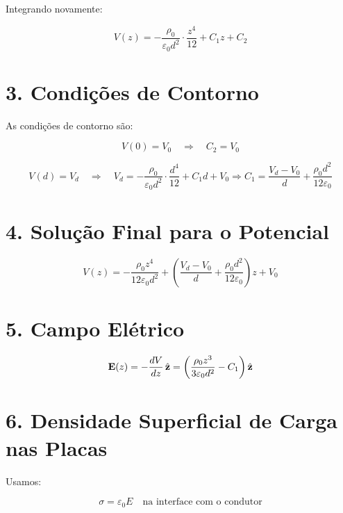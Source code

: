 \documentclass[a4paper,12pt]{article}
\begin{document}
\begin{flushleft}
Integrando novamente:

\begin{equation}
V(z) = -\frac{\rho_0}{\varepsilon_0 d^2} \cdot \frac{z^4}{12} + C_1 z + C_2
\end{equation}

\section*{3. Condições de Contorno}

As condições de contorno são:

\begin{equation}
V(0) = V_0 \quad \Rightarrow \quad C_2 = V_0
\end{equation}

\begin{equation}
V(d) = V_d \quad \Rightarrow \quad 
V_d = -\frac{\rho_0}{\varepsilon_0 d^2} \cdot \frac{d^4}{12} + C_1 d + V_0
\Rightarrow C_1 = \frac{V_d - V_0}{d} + \frac{\rho_0 d^2}{12 \varepsilon_0}
\end{equation}

\section*{4. Solução Final para o Potencial}

\begin{equation}
\boxed{
V(z) = -\frac{\rho_0 z^4}{12 \varepsilon_0 d^2} + \left( \frac{V_d - V_0}{d} + \frac{\rho_0 d^2}{12 \varepsilon_0} \right) z + V_0
}
\end{equation}

\section*{5. Campo Elétrico}

\begin{equation}
\vb{E}(z) = -\frac{dV}{dz} \, \hat{\vb{z}} = \left( \frac{\rho_0 z^3}{3 \varepsilon_0 d^2} - C_1 \right) \hat{\vb{z}}
\end{equation}

\section*{6. Densidade Superficial de Carga nas Placas}

Usamos:

\begin{equation}
\sigma = \varepsilon_0 E \quad \text{na interface com o condutor}
\end{equation}


\end{flushleft}
\end{document}
